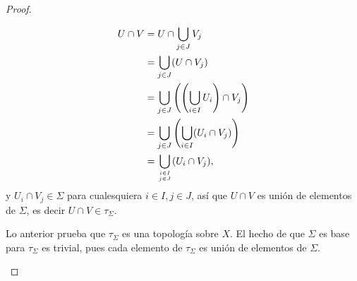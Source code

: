 \begin{proof}
\begin{itemize}
\begin{itemize}
               $$
               \begin{aligned}
                  U\cap V&=U\cap{\bigcup_{j\in J}V_j}\\
                         &=\bigcup_{j\in J}(U\cap V_j)\\
                         &=\bigcup_{j\in J}\left( \left( \bigcup_{i\in I}U_i\right)\cap V_j\right)\\
                         &=\bigcup_{j\in J}\left( \bigcup_{i\in I}(U_i\cap V_j)\right)\\
                         &=\bigcup_{{i\in I}\atop {j\in J}}(U_i\cap V_j),
               \end{aligned}
               $$
               y $U_i\cap V_j\in\Sigma$ para cualesquiera $i\in I, j\in J$, así que $U\cap V$ es unión de elementos de $\Sigma$, es decir $U\cap V\in \tau_\Sigma$.
         \end{itemize}
         Lo anterior prueba que $\tau_\Sigma$ es una topología sobre $X$. El hecho de que $\Sigma$ es base para $\tau_\Sigma$ es trivial, pues cada elemento de $\tau_\Sigma$ es unión de elementos de $\Sigma$.
   \end{itemize}
\end{proof}
